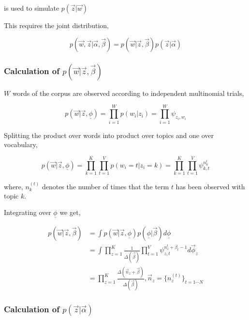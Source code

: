 is used to simulate \(p(\vec{z}|\vec{w})\)

This requires the joint distribution, 

\begin{equation}
p(\vec{w},\vec{z}|\vec{\alpha},\vec{\beta}) = p(\vec{w}|\vec{z},\vec{\beta})p(\vec{z}|\vec{\alpha})\label{eqn:wzgivenalphbetaincomplete}
\end{equation}

\subsubsection*{Calculation of \(p(\vec{w}|\vec{z},\vec{\beta})\)}

\(W\) words of the corpus are observed according to independent multinomial trials,

\begin{equation}
 p(\vec{w}|\vec{z},\underline{\phi}) = \prod_{i=1}^{W} p(w_i|z_i) = \prod_{i=1}^{W} \psi_{z_i,w_i}
\end{equation}

Splitting the product over words into product over topics and one over vocabulary,

\begin{equation}\label{eqn:wgivenpsi}
 p(\vec{w}|\vec{z},\underline{\phi}) = \prod_{k=1}^{K} \prod_{t=1}^{V} p(w_i=t|z_i=k) = \prod_{k=1}^{K} \prod_{t=1}^{V} \psi_{k,t}^{n_{k}^{t}}
\end{equation}

where, \(n_k^{(t)}\) denotes the number of times that the term \(t\) has been observed with topic \(k\).

Integrating  over \(\underline{\phi}\) we get,

\begin{align}
  p(\vec{w}|\vec{z},\vec{\beta})	& = \int p(\vec{w}|\vec{z},\underline{\phi})p(\underline{\phi}|\vec{\beta})d\underline{\phi} \\
					& = \int \prod_{z=1}^{K} \frac{1}{\Delta(\vec{\beta})} \prod_{t=1}^{V} \psi_{z,t}^{n_{z}^{t}+\beta_t-1}d\vec{\phi}_z \\ 
					& = \prod_{z=1}^{K} \frac{\Delta(\vec{n}_z+\vec{\beta})}{\Delta(\vec{\beta})}, \vec{n}_z = \{n_{z}^{(t)}\}_{t=1 \cdots N}
					\label{eqn:wgivenbeta}
\end{align}

\subsubsection*{Calculation of \(p(\vec{z}|\vec{\alpha})\)}

